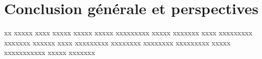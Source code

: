 \chapter*{Conclusion générale et perspectives}
\adjustmtc
\thispagestyle{MyStyle}
xx xxxxx xxxx xxxxx xxxxx xxxxx xxxxxxxxx xxxxx xxxxxxx xxxx xxxxxxxxx xxxxxxx xxxxxx xxxx xxxxxxxxx xxxxxxxx xxxxxxxx xxxxxxxxx xxxxx xxxxxxxxxxx xxxxx xxxxxxx 

